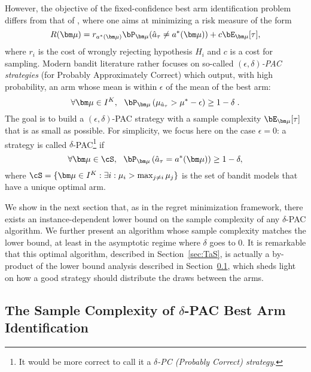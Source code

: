 \documentclass[proc]{edpsmath}
\begin{document}
	However, the objective of the fixed-confidence best arm identification problem differs from that of \cite{Chernoff59}, where one aims at minimizing a risk measure of the form 
	\[R(\bm \mu) = r_{a^*(\bm \mu)}\bP_{\bm \mu}(\hat{a}_{\tau} \neq a^*(\bm \mu)) + c\bE_{\bm\mu}[\tau],\]
	where $r_i$ is the cost of wrongly rejecting hypothesis $H_i$ and $c$ is a cost for sampling. Modern bandit literature rather focuses on so-called \emph{$(\epsilon,\delta)$-PAC strategies} (for Probably Approximately Correct) which output, with high probability, an arm whose mean is within $\epsilon$ of the mean of the best arm:
	\[\forall \bm \mu \in I^K, \ \ \bP_{\bm \mu}\left(\mu_{\hat{a}_\tau} > \mu^* - \epsilon\right) \geq 1 - \delta\;.\]
	The goal is to build a $(\epsilon,\delta)$-PAC strategy with a sample complexity $\bE_{\bm \mu}[\tau]$ that is as small as possible. 
	For simplicity, we focus here on the case $\epsilon=0$: a strategy is called $\delta$-PAC\footnote{It would be more correct to call it a \emph{$\delta$-PC (Probably Correct) strategy}.} if 
	\[\forall \bm \mu \in \cS, \ \ \bP_{\bm \mu}\left(\hat{a}_{\tau} = a^*(\bm \mu)\right) \geq 1 - \delta,\]
	where $\cS = \{\bm \mu \in I^K : \exists i : \mu_i > \max_{j\neq i} \mu_j\}$ is the set of bandit models that have a unique optimal arm.
	
	We show in the next section that, as in the regret minimization framework, there exists an instance-dependent lower bound on the sample complexity of any $\delta$-PAC algorithm.
	We further present an algorithm whose sample complexity matches the lower bound, at least in the asymptotic regime where $\delta$ goes to $0$. 
	It is remarkable that this optimal algorithm, described in Section~\ref{sec:TaS}, is actually a by-product of the lower bound analysis described in Section~\ref{sec:BAILB}, which sheds light on how a good strategy should distribute the draws between the arms.
	
	\subsection{The Sample Complexity of $\delta$-PAC Best Arm Identification}\label{sec:BAILB}
	
\end{document}
